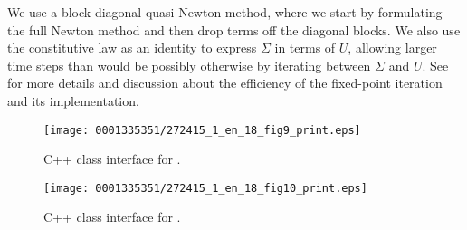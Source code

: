 We use a block-diagonal quasi-Newton method, where we start by
formulating the full Newton method and then drop terms off the
diagonal blocks. We also use the constitutive law as an identity to
express $\Sigma$ in terms of $U$, allowing larger time steps than
would be possibly otherwise by iterating between $\Sigma$ and $U$.
See \citet{Jansson2009,HoffmanJanssonStockli2011} for more details and
discussion about the efficiency of the fixed-point iteration and its
implementation.

\begin{figure}[!p]
\vspace*{-1.5pc}
\bwfig
\texttt{[image: 0001335351/272415\_1\_en\_18\_fig9\_print.eps]}
\caption{C++ class interface for .}
\label{code:ErrorEstimate}\vspace*{-8pt}
\end{figure}

\begin{figure}[!p]
\bwfig
\texttt{[image: 0001335351/272415\_1\_en\_18\_fig10\_print.eps]}
\caption{C++ class interface for .}
\label{code:SpaceTimeFunction}
\vspace*{1.5pc}
\end{figure}

